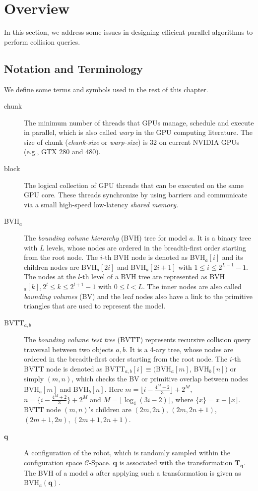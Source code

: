 \section{Overview}
\label{sec:5:overview}
In this section, we address
some issues in designing efficient parallel algorithms to perform collision queries.

\subsection{Notation and Terminology}
We define some terms and symbols used in the rest of this chapter.
\begin{description}
\item[chunk] The minimum number of threads that GPUs manage, schedule and execute in parallel, which is also called \emph{warp} in the GPU computing literature. The size of chunk (\emph{chunk-size} or \emph{warp-size}) is 32 on current NVIDIA GPUs (e.g., GTX 280 and 480).
\item[block] The logical collection of GPU threads that can be executed on the same GPU core. These threads synchronize by using barriers
and communicate via a small high-speed low-latency \emph{shared memory}.
\item[BVH$_a$] The \emph{bounding volume hierarchy} (BVH) tree for model $a$. It is a binary tree with $L$ levels, whose nodes are ordered in the breadth-first order starting from the root node. The $i$-th BVH node is denoted as BVH$_a[i]$ and its children nodes are
BVH$_a[2i]$ and BVH$_a[2i+1]$ with $1\leq i \leq 2^{L-1}-1$. The nodes at the $l$-th level of a BVH tree are represented as
BVH$_a[k], 2^l \leq k \leq 2^{l+1} - 1$ with $0
\leq l < L$. The inner nodes are also called \emph{bounding volumes} (BV) and the leaf nodes also have a link to the primitive
triangles that are used to represent the model.
\item[BVTT$_{a,b}$] The \emph{bounding volume test tree} (BVTT) represents recursive collision query traversal between two
objects $a, b$. It is a 4-ary tree, whose nodes are ordered in the breadth-first order starting from the root node. The $i$-th BVTT node is denoted as BVTT$_
{a,b}[i]\equiv ($BVH$_a[m]$, BVH$_b[n])$ or simply $(m, n)$, which checks the BV or primitive overlap between nodes BVH$_a[m]$ and BVH$_b[n]$. Here $m = \lfloor i - \frac{4^M + 2}{3} \rfloor + 2^M$, $n = \{i - \frac{4^M + 2}{3}\} + 2^M$ and $M = \lfloor \log_4(3i -
2) \rfloor$, where $\{x\} = x - \lfloor x \rfloor$. BVTT node $(m, n)$'s children are $(2m, 2n)$, $(2m, 2n+1)$, $(2m+1,2n)$, $(2m+1,2n+1)$.
\item[$\mathbf{q}$] A configuration of the robot, which is randomly sampled within the
configuration space $\mathcal{C}$-Space.  $\mathbf{q}$ is associated with the transformation $\mathbf{T}_{\mathbf{q}}$.
The BVH of a model $a$ after applying such a transformation is given as BVH$_a(\mathbf{q})$.
\end{description}


